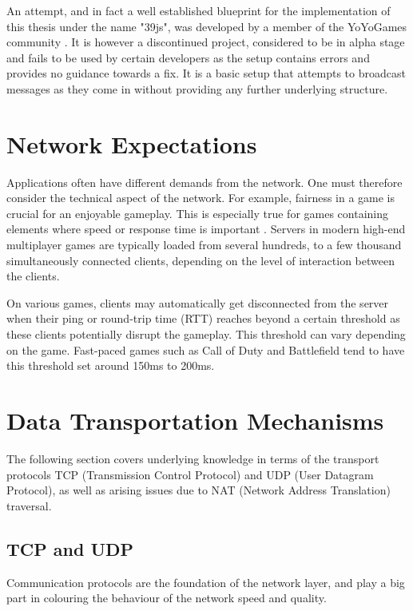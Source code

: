 \documentclass[bsc, 12pt, twoside, singlespacing, parskip, abbrevs, notimes, normalheadings, logo]{styles/infthesis}
\begin{document}
An attempt, and in fact a well established blueprint for the implementation of this thesis under the name "39js", was developed by a member of the YoYoGames community \cite{gamemaker_networking_attempt}. It is however a discontinued project, considered to be in alpha stage and fails to be used by certain developers as the setup contains errors and provides no guidance towards a fix. It is a basic setup that attempts to broadcast messages as they come in without providing any further underlying structure.


\section{Network Expectations}
Applications often have different demands from the network. One must therefore consider the technical aspect of the network. For example, fairness in a game is crucial for an enjoyable gameplay. This is especially true for games containing elements where speed or response time is important \cite{Fairness_and_Playability}. Servers in modern high-end multiplayer games are typically loaded from several hundreds, to a few thousand simultaneously connected clients, depending on the level of interaction between the clients.

On various games, clients may automatically get disconnected from the server when their ping or round-trip time (RTT) reaches beyond a certain threshold as these clients potentially disrupt the gameplay. This threshold can vary depending on the game. Fast-paced games such as Call of Duty and Battlefield tend to have this threshold set around 150ms to 200ms.

\section{Data Transportation Mechanisms}
The following section covers underlying knowledge in terms of the transport protocols TCP (Transmission Control Protocol) and UDP (User Datagram Protocol), as well as arising issues due to NAT (Network Address Translation) traversal.

\subsection{TCP and UDP}
Communication protocols are the foundation of the network layer, and play a big part in colouring the behaviour of the network speed and quality.
\end{document}
